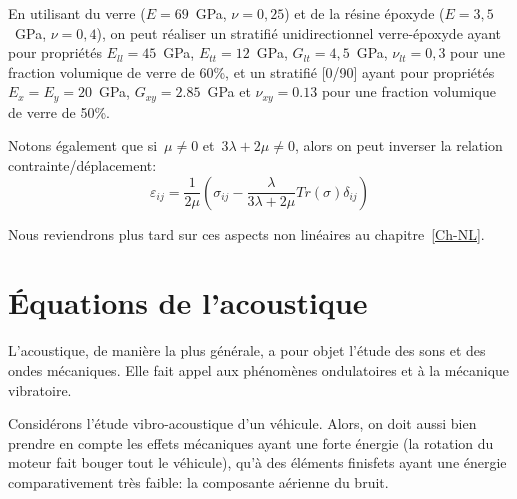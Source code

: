 En utilisant du verre ($E=69$~GPa, $\nu=0,25$) et de la résine époxyde ($E=3,5$~GPa, $\nu=0,4$), on peut réaliser
un stratifié unidirectionnel verre-époxyde ayant pour propriétés $E_{ll}=45$~GPa, $E_{tt}=12$~GPa, $G_{lt}=4,5$~GPa, $\nu_{lt}=0,3$ pour une fraction volumique de verre de 60\%, et un stratifié [0/90] ayant pour propriétés $E_x=E_y=20$~GPa, $G_{xy}=2.85$~GPa et $\nu_{xy}=0.13$ pour une fraction volumique de verre de 50\%.


\medskip
Notons également que si~$\mu\ne0$ et~$3\lambda+2\mu\ne0$, alors on peut inverser la
relation contrainte/dé\-pla\-ce\-ment:
\begin{equation}
\varepsilon_{ij}=\dfrac1{2\mu}\left(\sigma_{ij}-\dfrac\lambda{3\lambda+2\mu}Tr(\sigma)\delta_{ij}\right)
\end{equation}

\medskip
Nous reviendrons plus tard sur ces aspects non linéaires au chapitre~\ref{Ch-NL}.


\medskip
\section{Équations de l'acoustique}
L'acoustique, de manière la plus générale, a pour objet l'étude des sons et des ondes mécaniques. 
Elle fait appel aux phénomènes ondulatoires et à la mécanique vibratoire.

Considérons l'étude vibro-acoustique d'un véhicule.
Alors, on doit aussi bien prendre en compte les effets mécaniques ayant une forte
énergie (la rotation du moteur fait bouger tout le véhicule), qu'à des éléments finisfets ayant
une énergie comparativement très faible: la composante aérienne du bruit.

